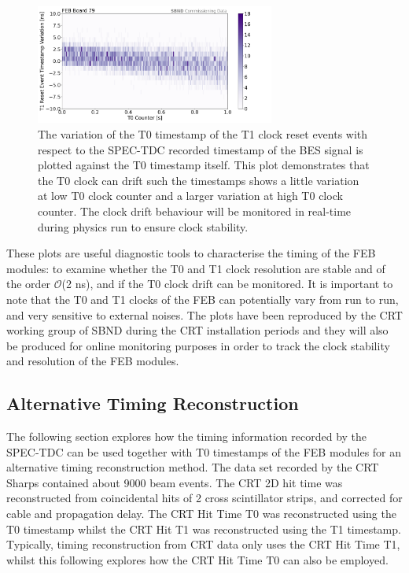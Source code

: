 \begin{figure}[htbp!] 
\centering    
\includegraphics[width=0.70\textwidth]{board79_T1drift_2d}
\caption[Board79T1Drift2d]{
The variation of the T0 timestamp of the T1 clock reset events with respect to the SPEC-TDC recorded timestamp of the BES signal is plotted against the T0 timestamp itself.
This plot demonstrates that the T0 clock can drift such the timestamps shows a little variation at low T0 clock counter and a larger variation at high T0 clock counter.
The clock drift behaviour will be monitored in real-time during physics run to ensure clock stability.
}
\label{fig:Board79T1Drift2d}
\end{figure}

These plots are useful diagnostic tools to characterise the timing of the FEB modules: to examine whether the T0 and T1 clock resolution are stable and of the order $\mathcal{O}$(2 ns), and if the T0 clock drift can be monitored.
It is important to note that the T0 and T1 clocks of the FEB can potentially vary from run to run, and very sensitive to external noises. 
The plots have been reproduced by the CRT working group of SBND during the CRT installation periods and they will also be produced for online monitoring purposes in order to track the clock stability and resolution of the FEB modules.

\subsection{Alternative Timing Reconstruction}

The following section explores how the timing information recorded by the SPEC-TDC can be used together with T0 timestamps of the FEB modules for an alternative timing reconstruction method.
The data set recorded by the CRT Sharps contained about 9000 beam events. 
The CRT 2D hit time was reconstructed from coincidental hits of 2 cross scintillator strips, and corrected for cable and propagation delay.
The CRT Hit Time T0 was reconstructed using the T0 timestamp whilst the CRT Hit T1 was reconstructed using the T1 timestamp. 
Typically, timing reconstruction from CRT data only uses the CRT Hit Time T1, whilst this following explores how the CRT Hit Time T0 can also be employed.

